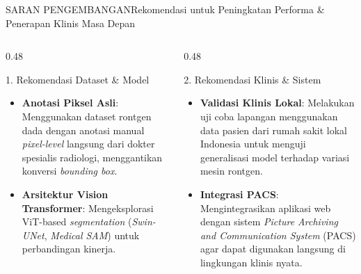 \documentclass[aspectratio=169,11pt]{beamer}
\begin{document}
\begin{frame}{SARAN PENGEMBANGAN}{Rekomendasi untuk Peningkatan Performa \& Penerapan Klinis Masa Depan}
\begin{columns}[T]
  \begin{column}{0.48\textwidth}
    \begin{block}{\footnotesize 1. Rekomendasi Dataset \& Model}
      \begin{itemize}\scriptsize
        \item \textbf{Anotasi Piksel Asli}: Menggunakan dataset rontgen dada dengan anotasi manual \textit{pixel-level} langsung dari dokter spesialis radiologi, menggantikan konversi \textit{bounding box}.
        \item \textbf{Arsitektur Vision Transformer}: Mengeksplorasi ViT-based \textit{segmentation} (\textit{Swin-UNet}, \textit{Medical SAM}) untuk perbandingan kinerja.
      \end{itemize}
    \end{block}
  \end{column}

  \begin{column}{0.48\textwidth}
    \begin{block}{\footnotesize 2. Rekomendasi Klinis \& Sistem}
      \begin{itemize}\scriptsize
        \item \textbf{Validasi Klinis Lokal}: Melakukan uji coba lapangan menggunakan data pasien dari rumah sakit lokal Indonesia untuk menguji generalisasi model terhadap variasi mesin rontgen.
        \item \textbf{Integrasi PACS}: Mengintegrasikan aplikasi web dengan sistem \textit{Picture Archiving and Communication System} (PACS) agar dapat digunakan langsung di lingkungan klinis nyata.
      \end{itemize}
    \end{block}
  \end{column}
\end{columns}
\end{frame}
\end{document}
